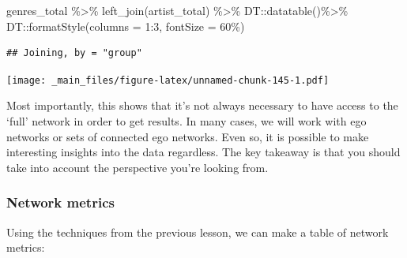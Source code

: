 \documentclass[
]{book}
\newenvironment{Shaded}{\begin{snugshade}}{\end{snugshade}}
\newcommand{\AttributeTok}[1]{\textcolor[rgb]{0.77,0.63,0.00}{#1}}
\newcommand{\DecValTok}[1]{\textcolor[rgb]{0.00,0.00,0.81}{#1}}
\newcommand{\FunctionTok}[1]{\textcolor[rgb]{0.00,0.00,0.00}{#1}}
\newcommand{\NormalTok}[1]{#1}
\newcommand{\SpecialCharTok}[1]{\textcolor[rgb]{0.00,0.00,0.00}{#1}}
\newcommand{\StringTok}[1]{\textcolor[rgb]{0.31,0.60,0.02}{#1}}
\begin{document}
\begin{Shaded}
\begin{Highlighting}[]
\NormalTok{genres\_total }\SpecialCharTok{\%\textgreater{}\%} \FunctionTok{left\_join}\NormalTok{(artist\_total) }\SpecialCharTok{\%\textgreater{}\%}\NormalTok{ DT}\SpecialCharTok{::}\FunctionTok{datatable}\NormalTok{()}\SpecialCharTok{\%\textgreater{}\%}
\NormalTok{  DT}\SpecialCharTok{::}\FunctionTok{formatStyle}\NormalTok{(}\AttributeTok{columns =} \DecValTok{1}\SpecialCharTok{:}\DecValTok{3}\NormalTok{, }\AttributeTok{fontSize =} \StringTok{\textquotesingle{}60\%\textquotesingle{}}\NormalTok{)}
\end{Highlighting}
\end{Shaded}

\begin{verbatim}
## Joining, by = "group"
\end{verbatim}

\texttt{[image: \_main\_files/figure-latex/unnamed-chunk-145-1.pdf]}

Most importantly, this shows that it's not always necessary to have access to the `full' network in order to get results. In many cases, we will work with ego networks or sets of connected ego networks. Even so, it is possible to make interesting insights into the data regardless. The key takeaway is that you should take into account the perspective you're looking from.

\hypertarget{network-metrics}{%
\subsubsection{Network metrics}\label{network-metrics}}

Using the techniques from the previous lesson, we can make a table of network metrics:
\end{document}
